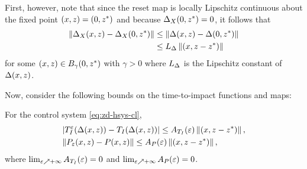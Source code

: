 First, however, note that since the reset map is locally Lipschitz continuous about the fixed point $(x, z) = (0, z^{*})$ and because $\Delta_{X}(0, z^{*}) = 0$, it follows that
%
\begin{align} 
  \nonumber
  \left\| \Delta_{X}(x, z) - \Delta_{X}(0, z^{*}) \right\| &\leq \left\| \Delta(x, z) - \Delta(0, z^{*}) \right\|
  \\
  \label{eq:impact-Lipschitz}
  &\leq L_{\Delta} \left\|(x, z - z^{*})\right\|
\end{align}
%
for some $(x, z) \in B_{\gamma}(0, z^{*})$ with $\gamma > 0$ where $L_{\Delta}$ is the Lipschitz constant of $\Delta(x, z)$.

Now, consider the following bounds on the time-to-impact functions and \Poincare{} maps:\vgap

\begin{lemma}
  \label{lemma:TIe-P-bounds}
  For the control system \eqref{eq:zd-hsys-cl},
  \begin{eqnarray}
    \nonumber
    &| T_{I}^{\varepsilon}(\Delta(x, z)) - T_{I}(\Delta(x, z)) | \leq A_{T_{I}}(\varepsilon) \left\|(x, z - z^{*})\right\|,\\
    &\| P_{\varepsilon}(x, z) - P(x, z) \| \leq A_{P}(\varepsilon) \left\|(x, z - z^{*})\right\|,
  \end{eqnarray}
  where $\lim_{\varepsilon \nearrow +\infty} A_{T_{I}}(\varepsilon) = 0$ and $\lim_{\varepsilon \nearrow +\infty}A_{P}(\varepsilon) = 0$.\vgap
\end{lemma}
